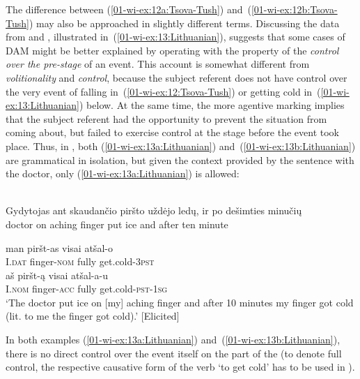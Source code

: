 \documentclass[output=paper]{LSP/langsci}
\begin{document}
\noindent The difference between (\ref{01-wi-ex:12a:Tsova-Tush}) and~(\ref{01-wi-ex:12b:Tsova-Tush}) may also be approached in slightly different terms. 
Discussing the data from  and , illustrated in~(\ref{01-wi-ex:13:Lithuanian}), \citet{Serzant2013Rise} suggests that some cases of DAM might be better explained by operating with the property of the \textit{control over the pre-stage} of an event. 
This account is somewhat different from \textit{volitionality} and \textit{control}, because the subject referent does not have control over the very event of falling in~(\ref{01-wi-ex:12:Tsova-Tush}) or getting cold in~(\ref{01-wi-ex:13:Lithuanian}) below. 
At the same time, the more agentive marking implies that the subject referent had the opportunity to prevent the situation from coming about, but failed to exercise control at the stage before the event took place. 
Thus, in , both (\ref{01-wi-ex:13a:Lithuanian}) and~(\ref{01-wi-ex:13b:Lithuanian}) are grammatical in isolation, but given the context provided by the sentence with the doctor, only (\ref{01-wi-ex:13a:Lithuanian}) is allowed:

\ea\label{01-wi-ex:13:Lithuanian}
\\

	\gll Gydytojas	ant	skaudančio	piršto	uždėjo	ledų, ir		po	dešimties	minučių\\
	doctor		on	aching		finger	put	ice and	after	ten		minute\\

\begin{xlist}

\ex\label{01-wi-ex:13a:Lithuanian}
	\gll man	piršt-as	visai	atšal-o\\
	I.\textsc{dat}	finger-\textsc{nom}	fully	get.cold-\textsc{3pst}\\

\ex\label{01-wi-ex:13b:Lithuanian}
	\gll *aš	piršt-ą		visai	atšal-a-u\\
	I.\textsc{nom}	finger-\textsc{acc}	fully	get.cold-\textsc{pst}-\textsc{1sg}\\
	\glt ‘The doctor put ice on [my] aching finger and after 10 minutes my finger got cold (lit. to me the finger got cold).’ [Elicited]
\end{xlist}
\z

\noindent In both examples (\ref{01-wi-ex:13a:Lithuanian}) and~(\ref{01-wi-ex:13b:Lithuanian}), there is no direct control over the event itself on the part of the  (to denote full control, the respective causative form of the verb ‘to get cold’ has to be used in ).
\end{document}
